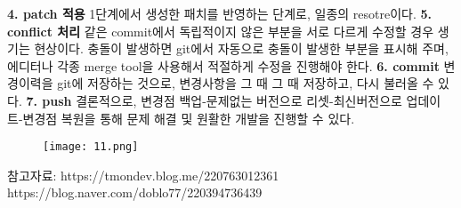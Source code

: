 \documentclass[15pt]{article}
\begin{document}
\textbf{4. patch 적용}\newline
1단계에서 생성한 패치를 반영하는 단계로, 일종의 resotre이다.\newline\newline
\textbf{5. conflict 처리}\newline
같은 commit에서 독립적이지 않은 부분을 서로 다르게 수정할 경우 생기는 현상이다. 충돌이 발생하면 git에서 자동으로 충돌이 발생한 부분을 표시해 주며, 에디터나 각종 merge tool을 사용해서 적절하게 수정을 진행해야 한다.\newline\newline
\textbf{6. commit}\newline
변경이력을 git에 저장하는 것으로, 변경사항을 그 때 그 때 저장하고, 다시 불러올 수 있다. 
\newline\newline
\textbf{7. push}\newline
결론적으로, 변경점 백업-문제없는 버전으로 리셋-최신버전으로 업데이트-변경점 복원을 통해 문제 해결 및 원활한 개발을 진행할 수 있다.\newline
\begin{figure}
\centering
\texttt{[image: 11.png]}
\end{figure}
참고자료:\newline
https://tmondev.blog.me/220763012361 \newline
https://blog.naver.com/doblo77/220394736439\newline
\end{document}
